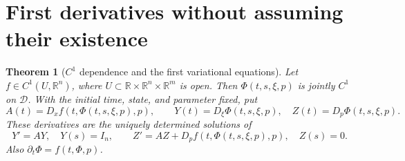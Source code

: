 \documentclass[11pt,oneside]{book}
\newtheorem{theorem}{Theorem}[chapter]
\theoremstyle{definition}
\theoremstyle{remark}\newtheorem{remark}[theorem]{Remark}
\newcommand{\R}{\mathbb R}\newcommand{\C}{\mathbb C}
\begin{document}
\section{First derivatives without assuming their existence}
\begin{theorem}[$C^1$ dependence and the first variational equations]\label{d13:06:c1-dependence}
Let $f\in C^1(U,\R^n)$, where
$U\subset\R\times\R^n\times\R^m$ is open. Then
$\Phi(t,s,\xi,p)$ is jointly $C^1$ on $\mathcal D$. With the
initial time, state, and parameter fixed, put
\[
 A(t)=D_xf(t,\Phi(t,s,\xi,p),p),\qquad
 Y(t)=D_\xi\Phi(t,s,\xi,p),\quad
 Z(t)=D_p\Phi(t,s,\xi,p).
\]
These derivatives are the uniquely determined solutions of
\[
 Y'=AY,\quad Y(s)=I_n,\qquad
 Z'=AZ+D_pf(t,\Phi(t,s,\xi,p),p),\quad Z(s)=0.
\]
Also $\partial_t\Phi=f(t,\Phi,p)$.
\end{theorem}
\end{document}
